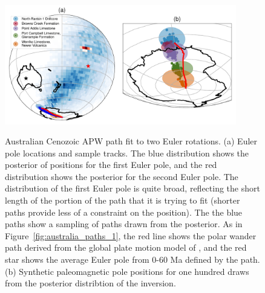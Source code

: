 \documentclass[preprint,12pt,authoryear]{elsarticle}
\begin{document}
\begin{figure}
\includegraphics[width=0.9\textwidth]{figures/australia/australia_paths_2.pdf}
\label{fig:australia_paths_2}
\caption[Australian Cenozoic APW path fit to two Euler rotations.]{Australian Cenozoic APW path fit to two Euler rotations. 
(a) Euler pole locations and sample tracks. The blue distribution shows the posterior of positions for the first Euler pole, and the red distribution shows the posterior for the second Euler pole. The distribution of the first Euler pole is quite broad, reflecting the short length of the portion of the path that it is trying to fit (shorter paths provide less of a constraint on the position). The the blue paths show a sampling of paths drawn from the posterior. As in Figure~\ref{fig:australia_paths_1}, the red line shows the polar wander path derived from the global plate motion model of \citet{seton2012global}, and the red star shows the average Euler pole from 0-60 Ma defined by the \citet{seton2012global} path.
(b) Synthetic paleomagnetic pole positions for one hundred draws from the posterior distribtion of the inversion.}
\end{figure}
\end{document}

